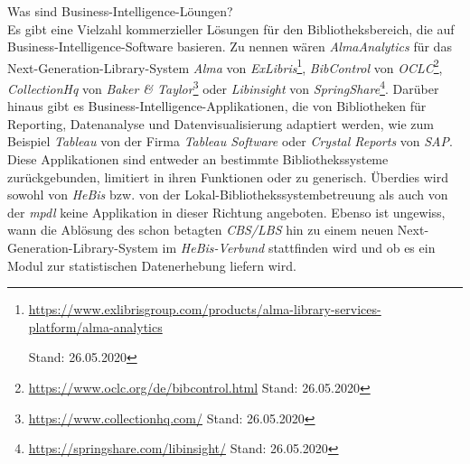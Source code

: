 Was sind Business-Intelligence-Löungen?\\
Es gibt eine Vielzahl kommerzieller Lösungen für den Bibliotheksbereich, die auf Business-Intelligence-Software basieren.
Zu nennen wären \textit{AlmaAnalytics} für das Next-Generation-Library-System \textit{Alma} von \textit{ExLibris}\footnote{\url{https://www.exlibrisgroup.com/products/alma-library-services-platform/alma-analytics}

Stand: 26.05.2020}, \textit{BibControl} von \textit{OCLC}\footnote{\url{https://www.oclc.org/de/bibcontrol.html} Stand: 26.05.2020},
\textit{CollectionHq} von \textit{Baker \& Taylor}\footnote{\url{https://www.collectionhq.com/} Stand: 26.05.2020} oder \textit{Libinsight} von \textit{SpringShare}\footnote{\url{https://springshare.com/libinsight/} Stand: 26.05.2020}.
Darüber hinaus gibt es Business-Intelligence-Applikationen, die von
Bibliotheken für Reporting, Datenanalyse und Datenvisualisierung adaptiert werden,
wie zum Beispiel \textit{Tableau} von der Firma \textit{Tableau Software} oder
\textit{Crystal Reports} von \textit{SAP}.
Diese Applikationen sind entweder
an bestimmte Bibliothekssysteme zurückgebunden, limitiert in ihren
Funktionen\cite{golas_statistische_2018} oder zu generisch.
Überdies wird sowohl von \textit{HeBis} bzw. von der
Lokal-Bibliothekssystembetreuung als auch von der \textit{mpdl} keine Applikation
in dieser Richtung angeboten.
Ebenso ist ungewiss, wann die Ablösung des schon betagten \textit{CBS/LBS} hin zu
einem neuen Next-Generation-Library-System im \textit{HeBis-Verbund} stattfinden wird und ob
es ein Modul zur statistischen Datenerhebung liefern wird.
